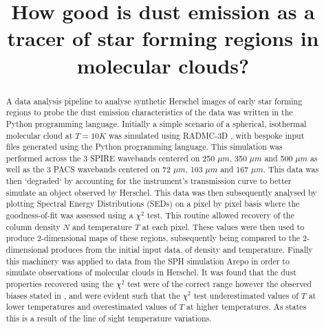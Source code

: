 \documentclass{report}
\title{\vspace{-15mm}\fontsize{24pt}{10pt}\selectfont\textbf{How good is dust emission as a tracer of star forming regions in molecular clouds?}} %
\author{
\large
\textsc{\parbox{\linewidth}{\centering%
Tomas James\endgraf\skip
Student ID: 1158976\endgraf\bigskip}} %
\vspace{-5mm}
}
\date{\large\parbox{\linewidth}{\centering%
  Supervisor: Dr. P. C. Clark \endgraf\bigskip\today}}
\begin{document}
\maketitle %

\thispagestyle{fancy} %


\begin{abstract}
A data analysis pipeline to analyse synthetic Herschel images of early star forming regions to probe the dust emission characteristics of the data was written in the Python programming language. Initially a simple scenario of a spherical, isothermal molecular cloud at $T=10K$ was simulated using RADMC-3D \parencite{RADMC-3D}, with bespoke input files generated using the Python programming language. This simulation was performed across the 3 SPIRE \parencite{SPIRE} wavebands centered on 250 $\mu m$, 350 $\mu m$ and 500 $\mu m$ as well as the 3 PACS \parencite{PACS} wavebands centered on 72 $\mu m$, 103 $\mu m$ and 167 $\mu m$. This data was then `degraded` by accounting for the instrument's transmission curve to better simulate an object observed by Herschel. This data was then subsequently analysed by plotting Spectral Energy Distributions (SEDs) on a pixel by pixel basis where the goodness-of-fit was assessed using a $\chi^{2}$ test. This routine allowed recovery of the column density $N$ and temperature $T$ at each pixel. These values were then used to produce 2-dimensional maps of these regions, subsequently being compared to the 2-dimensional produces from the initial input data. of density and temperature. Finally this machinery was applied to data from the SPH simulation Arepo in order to simulate observations of molecular clouds in Herschel. It was found that the dust properties recovered using the $\chi^{2}$ test were of the correct range however the observed biases stated in \textcite{noise}, \textcite{noiseb} and \textcite{kelly} were evident such that the $\chi^{2}$ test underestimated values of $T$ at lower temperatures and overestimated values of $T$ at higher temperatures. As \textcite{noise} states this is a result of the line of sight temperature variations.
\end{abstract}

\end{document}
